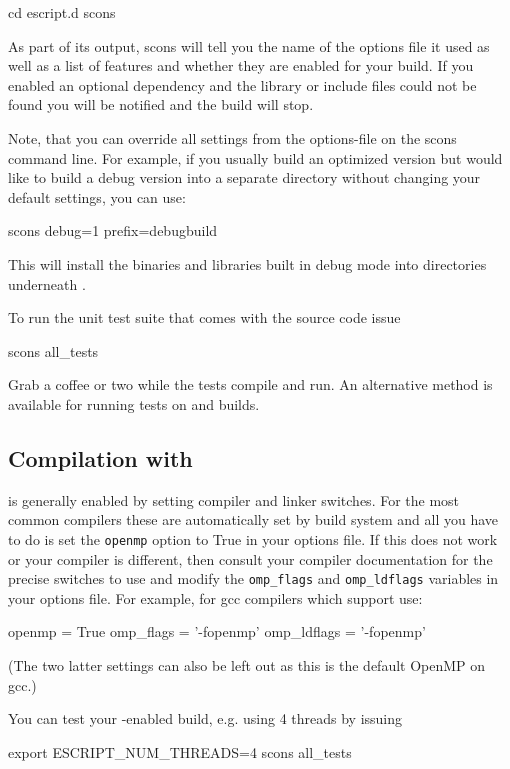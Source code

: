 \begin{shellCode}
cd escript.d
scons
\end{shellCode}

As part of its output, scons will tell you the name of the options file it used
as well as a list of features and whether they are enabled for your build.
If you enabled an optional dependency and the library or include files could
not be found you will be notified and the build will stop.

Note, that you can override all settings from the options-file on the scons
command line. For example, if you usually build an optimized version but would
like to build a debug version into a separate directory without changing your
default settings, you can use:
\begin{shellCode}
scons debug=1 prefix=debugbuild
\end{shellCode}
This will install the binaries and libraries built in debug mode into
directories underneath .

To run the unit test suite that comes with the source code issue
\begin{shellCode}
scons all_tests
\end{shellCode}
Grab a coffee or two while the tests compile and run.
An alternative method is available for running tests on \openmp and \mpi builds.

\subsection{Compilation with \openmp}
\openmp is generally enabled by setting compiler and linker switches. For the
most common compilers these are automatically set by build system and all you
have to do is set the \texttt{openmp} option to True in your options file. If
this does not work or your compiler is different, then consult your compiler
documentation for the precise switches to use and modify the \texttt{omp_flags}
and \texttt{omp_ldflags} variables in your options file.
For example, for gcc compilers which support \openmp use:
\begin{shellCode}
openmp = True
omp_flags = '-fopenmp'
omp_ldflags = '-fopenmp'
\end{shellCode}
(The two latter settings can also be left out as this is the default OpenMP on gcc.)

You can test your \openmp-enabled build, e.g. using 4 threads by issuing
\begin{shellCode}
export ESCRIPT_NUM_THREADS=4
scons all_tests
\end{shellCode}

